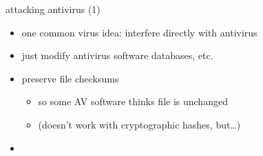 
\begin{frame}{attacking antivirus (1)}
    \begin{itemize}
    \item one common virus idea: interfere directly with antivirus
    \vspace{.5cm}
    \item just modify antivirus software databases, etc.
    \item preserve file checksums
        \begin{itemize}
        \item so some AV software thinks file is unchanged
        \item (doesn't work with cryptographic hashes, but\ldots)
        \end{itemize}
    \item {}
    \end{itemize}
\end{frame}
